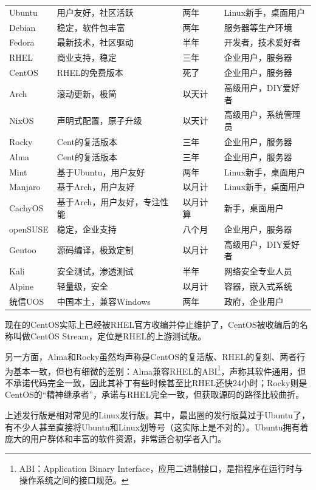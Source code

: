 \begin{small}
\begin{longtable}[c]{l|lll}
    Ubuntu & 用户友好，社区活跃 & 两年 & Linux新手，桌面用户 \\
    Debian & 稳定，软件包丰富 & 两年 & 服务器等生产环境 \\
    Fedora & 最新技术，社区驱动 & 半年 & 开发者，技术爱好者 \\
    RHEL & 商业支持，稳定 & 三年 & 企业用户，服务器 \\
    CentOS & RHEL的免费版本 & 死了 & 企业用户，服务器 \\
    Arch & 滚动更新，极简 & 以天计 & 高级用户，DIY爱好者 \\
    NixOS & 声明式配置，原子升级 & 以天计 & 高级用户，系统管理员 \\
    Rocky & Cent的复活版本 & 三年 & 企业用户，服务器 \\
    Alma & Cent的复活版本 & 三年 & 企业用户，服务器 \\
    Mint & 基于Ubuntu，用户友好 & 两年 & Linux新手，桌面用户 \\
    Manjaro & 基于Arch，用户友好 & 以月计 & Linux新手，桌面用户 \\
    CachyOS & 基于Arch，用户友好，专注性能 & 以月计算 & 新手，桌面用户 \\ 
    openSUSE & 稳定，企业支持 & 八个月 & 企业用户，服务器 \\
    Gentoo & 源码编译，极致定制 & 以月计 & 高级用户，DIY爱好者 \\
    Kali & 安全测试，渗透测试 & 半年 & 网络安全专业人员 \\
    Alpine & 轻量级，安全 & 以月计 & 容器，嵌入式系统 \\
    统信UOS & 中国本土，兼容Windows & 两年 & 政府，企业用户 \\
  \end{longtable}
\end{small}

\begin{tip}
  现在的CentOS实际上已经被RHEL官方收编并停止维护了，CentOS被收编后的名称叫做CentOS Stream，定位是RHEL的上游测试版。

  另一方面，Alma和Rocky虽然均声称是CentOS的复活版、RHEL的复刻、两者行为基本一致，但也有细微的差别：Alma兼容RHEL的ABI\footnote{ABI：Application Binary Interface，应用二进制接口，是指程序在运行时与操作系统之间的接口规范。}，声称其软件通用，但不承诺代码完全一致，因此其补丁有些时候甚至比RHEL还快24小时；Rocky则是CentOS的“精神继承者”，承诺与RHEL完全一致，但获取源码的路径比较曲折。
\end{tip}

上述发行版是相对常见的Linux发行版。其中，最出圈的发行版莫过于Ubuntu了，有不少人甚至直接将Ubuntu和Linux划等号（这实际上是不对的）。Ubuntu拥有着庞大的用户群体和丰富的软件资源，非常适合初学者入门。

